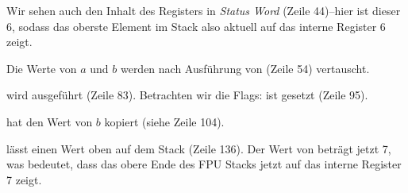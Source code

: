 Wir sehen auch den Inhalt des  Registers in \emph{Status Word} (Zeile
44)--hier ist dieser 6, sodass das oberste Element im Stack also aktuell auf das
interne Register 6 zeigt.

Die Werte von $a$ und $b$ werden nach Ausführung von  (Zeile 54)
vertauscht.

 wird ausgeführt (Zeile 83).
Betrachten wir die Flags: \CF ist gesetzt (Zeile 95).

 hat den Wert von $b$ kopiert (siehe Zeile 104).

\FSTP lässt einen Wert oben auf dem Stack (Zeile 136).
Der Wert von  beträgt jetzt 7, was bedeutet, dass das obere Ende des
FPU Stacks jetzt auf das interne Register 7 zeigt.
